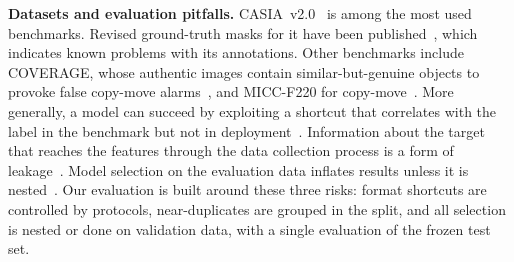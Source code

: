 \textbf{Datasets and evaluation pitfalls.} CASIA~v2.0~\cite{dong2013casia} is among the most used benchmarks.
Revised ground-truth masks for it have been published~\cite{pham2019casia}, which indicates known problems with
its annotations. Other benchmarks include COVERAGE, whose authentic images contain similar-but-genuine objects to
provoke false copy-move alarms~\cite{wen2016coverage}, and MICC-F220 for copy-move~\cite{amerini2011sift}. More
generally, a model can succeed by exploiting a shortcut that correlates with the label in the benchmark but not in
deployment~\cite{geirhos2020shortcut}. Information about the target that reaches the features through the data
collection process is a form of leakage~\cite{kaufman2012leakage}. Model selection on the evaluation data inflates
results unless it is nested~\cite{cawley2010nested}. Our evaluation is built around these three risks: format
shortcuts are controlled by protocols, near-duplicates are grouped in the split, and all selection is nested or
done on validation data, with a single evaluation of the frozen test set.
